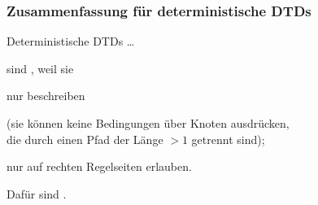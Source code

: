     \begin{frame}
      \frametitle{Zusammenfassung für deterministische DTDs}
      
      Deterministische DTDs \dots
      \par\smallskip
      \begin{Itemize}
        \item
          sind , weil sie
          \begin{Itemize}
            \item
              nur  beschreiben
              \par\smallskip
              (sie können keine Bedingungen über Knoten ausdrücken,\\
              die durch einen Pfad der Länge $>1$ getrennt sind);
            \item
              nur  auf rechten Regelseiten erlauben.
          \end{Itemize}
          \par\smallskip
        \item
          Dafür sind .
      \end{Itemize}


    \end{frame}

